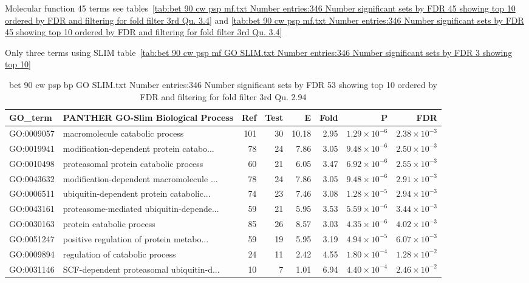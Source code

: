 Molecular function 45 terms see tables~\ref{tab:bet 90 cw psp mf.txt Number entries:346 Number significant sets by FDR 45 showing top 10 ordered by FDR and filtering for fold filter 3rd Qu. 3.4} and \ref{tab:bet 90 cw psp mf.txt Number entries:346 Number significant sets by FDR 45 showing top 10 ordered by FDR and filtering for fold filter 3rd Qu. 3.4}

Only three terms using SLIM table~\ref{tab:bet 90 cw psp mf GO SLIM.txt Number entries:346 Number significant sets by FDR 3 showing top 10}



\begin{table}[ht]
\centering
\begin{tabular}{llrrrrrr}
  \hline
GO\_term & PANTHER GO-Slim Biological Process & Ref & Test & E & Fold & P & FDR \\ 
  \hline
GO:0009057 & macromolecule catabolic process  & 101 & 30 & 10.18 & 2.95 & $1.29 \times 10^{-6}$ & $2.38 \times 10^{-3}$ \\ 
  GO:0019941 & modification-dependent protein catabo... & 78 & 24 & 7.86 & 3.05 & $9.48 \times 10^{-6}$ & $2.50 \times 10^{-3}$ \\ 
  GO:0010498 & proteasomal protein catabolic process  & 60 & 21 & 6.05 & 3.47 & $6.92 \times 10^{-6}$ & $2.55 \times 10^{-3}$ \\ 
  GO:0043632 & modification-dependent macromolecule ... & 78 & 24 & 7.86 & 3.05 & $9.48 \times 10^{-6}$ & $2.91 \times 10^{-3}$ \\ 
  GO:0006511 & ubiquitin-dependent protein catabolic... & 74 & 23 & 7.46 & 3.08 & $1.28 \times 10^{-5}$ & $2.94 \times 10^{-3}$ \\ 
  GO:0043161 & proteasome-mediated ubiquitin-depende... & 59 & 21 & 5.95 & 3.53 & $5.59 \times 10^{-6}$ & $3.44 \times 10^{-3}$ \\ 
  GO:0030163 & protein catabolic process  & 85 & 26 & 8.57 & 3.03 & $4.35 \times 10^{-6}$ & $4.02 \times 10^{-3}$ \\ 
  GO:0051247 & positive regulation of protein metabo... & 59 & 19 & 5.95 & 3.19 & $4.94 \times 10^{-5}$ & $6.07 \times 10^{-3}$ \\ 
  GO:0009894 & regulation of catabolic process  & 24 & 11 & 2.42 & 4.55 & $1.80 \times 10^{-4}$ & $1.28 \times 10^{-2}$ \\ 
  GO:0031146 & SCF-dependent proteasomal ubiquitin-d... & 10 & 7 & 1.01 & 6.94 & $4.40 \times 10^{-4}$ & $2.46 \times 10^{-2}$ \\ 
  \hline
\end{tabular}
\caption{bet 90 cw psp bp GO SLIM.txt Number entries:346 Number significant sets by FDR 53 showing top 10 ordered by FDR and filtering for fold filter 3rd Qu. 2.94} 
\label{tab:bet 90 cw psp bp GO SLIM.txt Number entries:346 Number significant sets by FDR 53 showing top 10 ordered by FDR and filtering for fold filter 3rd Qu. 2.94}
\end{table}
